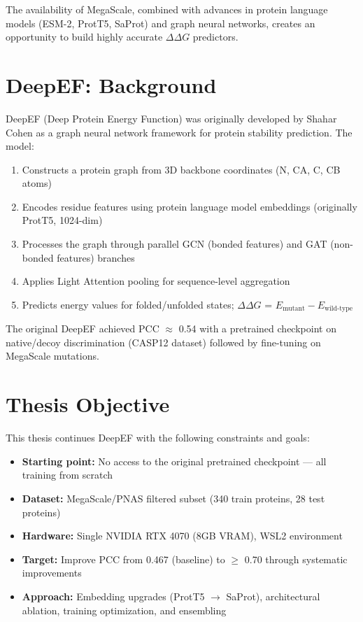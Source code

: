 The availability of MegaScale, combined with advances in protein language models (ESM-2, ProtT5, SaProt) and graph neural networks, creates an opportunity to build highly accurate $\Delta\Delta G$ predictors.

\section{DeepEF: Background}

DeepEF (Deep Protein Energy Function) was originally developed by Shahar Cohen as a graph neural network framework for protein stability prediction. The model:
\begin{enumerate}
    \item Constructs a protein graph from 3D backbone coordinates (N, CA, C, CB atoms)
    \item Encodes residue features using protein language model embeddings (originally ProtT5, 1024-dim)
    \item Processes the graph through parallel GCN (bonded features) and GAT (non-bonded features) branches
    \item Applies Light Attention pooling for sequence-level aggregation
    \item Predicts energy values for folded/unfolded states; $\Delta\Delta G$ = $E_{\text{mutant}} - E_{\text{wild-type}}$
\end{enumerate}

The original DeepEF achieved PCC $\approx$ 0.54 with a pretrained checkpoint on native/decoy discrimination (CASP12 dataset) followed by fine-tuning on MegaScale mutations.

\section{Thesis Objective}

This thesis continues DeepEF with the following constraints and goals:
\begin{itemize}
    \item \textbf{Starting point:} No access to the original pretrained checkpoint --- all training from scratch
    \item \textbf{Dataset:} MegaScale/PNAS filtered subset (340 train proteins, 28 test proteins)
    \item \textbf{Hardware:} Single NVIDIA RTX 4070 (8GB VRAM), WSL2 environment
    \item \textbf{Target:} Improve PCC from 0.467 (baseline) to $\geq$ 0.70 through systematic improvements
    \item \textbf{Approach:} Embedding upgrades (ProtT5 $\rightarrow$ SaProt), architectural ablation, training optimization, and ensembling
\end{itemize}

